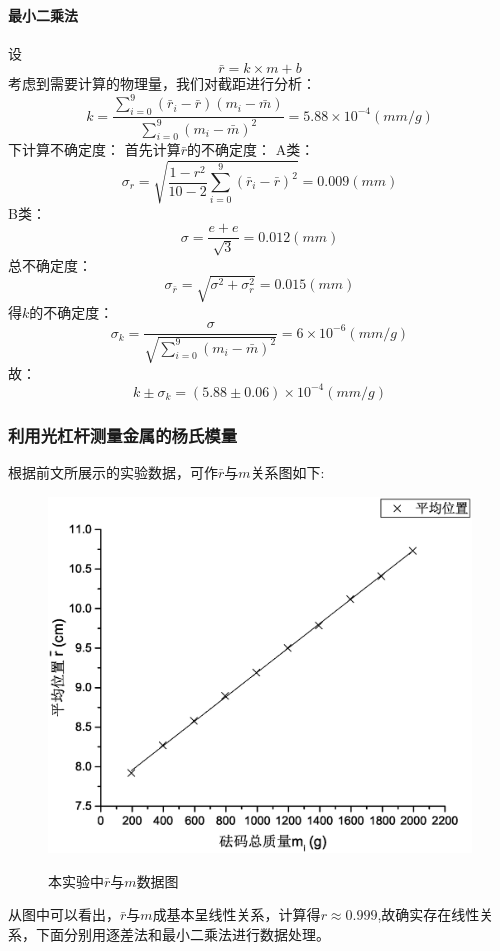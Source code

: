 \documentclass{ctexart}
\begin{document}
\paragraph{最小二乘法}
设$$\bar{r}=k\times m+b$$
考虑到需要计算的物理量，我们对截距进行分析：
$$k=\frac{\sum\limits_{i=0}^9{(\bar{r}_i-\bar{r})(m_i-\bar{m})}}{\sum\limits_{i=0}^9{(m_i-\bar{m})^2}}=5.88\times 10^{-4}(mm/g)$$
下计算不确定度：
首先计算$\bar{r}$的不确定度：
A类：$$\sigma_r =\sqrt{\frac{1-r^2}{10-2}\sum\limits_{i=0}^9{(\bar{r}_i-\bar{r})^2}}=0.009(mm)$$
B类：$$\sigma=\frac{e+e}{\sqrt{3}}=0.012(mm)$$
总不确定度：$$\sigma_{\bar{r}}=\sqrt{\sigma^2+\sigma_r^2}=0.015(mm)$$
得$k$的不确定度：
$$\sigma_k=\frac{\sigma}{\sqrt{\sum\limits_{i=0}^9{(m_i-\bar{m})^2}}}=6\times10^{-6}(mm/g)$$
故：
$$k\pm \sigma_k=(5.88\pm 0.06  )\times 10^{-4}(mm/g)$$
\subsubsection{利用光杠杆测量金属的杨氏模量}
根据前文所展示的实验数据，可作$\bar{r}$与$m$关系图如下:
\begin{figure}[H]
  \centering
  \caption{本实验中$\bar{r}$与$m$数据图}
  \includegraphics[width=\textwidth]{2}
  \label{fig:digit}
\end{figure}
从图中可以看出，$\bar{r}$与$m$成基本呈线性关系，计算得$r\approx 0.999$,故确实存在线性关系，下面分别用逐差法和最小二乘法进行数据处理。
\end{document}
